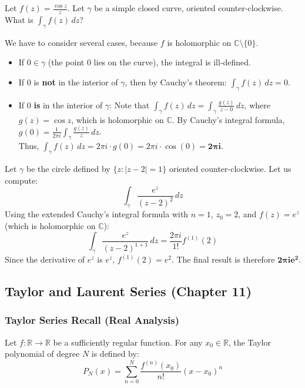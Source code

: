 \begin{example}[Example 1]
Let $f(z) = \frac{\cos z}{z}$. Let $\gamma$ be a simple closed curve, oriented counter-clockwise. What is $\int_{\gamma} f(z) \, dz$?

We have to consider several cases, because $f$ is holomorphic on $\mathbb{C} \setminus \{0\}$.
\begin{itemize}
    \item If $0 \in \gamma$ (the point $0$ lies on the curve), the integral is ill-defined.
    \item If $0$ is \textbf{not} in the interior of $\gamma$, then by Cauchy's theorem: $\int_{\gamma} f(z) \, dz = 0$.
    \item If $0$ \textbf{is} in the interior of $\gamma$:
    Note that $\int_{\gamma} f(z) \, dz = \int_{\gamma} \frac{g(z)}{z - 0} \, dz$, where $g(z) = \cos z$, which is holomorphic on $\mathbb{C}$. By Cauchy's integral formula, $g(0) = \frac{1}{2\pi i} \int_{\gamma} \frac{g(z)}{z} \, dz$. \\
    Thus, $\int_{\gamma} f(z) \, dz = 2\pi i \cdot g(0) = 2\pi i \cdot \cos(0) = \mathbf{2\pi i}$.
\end{itemize}
\end{example}

\begin{example}[Example 2]
Let $\gamma$ be the circle defined by $\{ z : |z - 2| = 1 \}$ oriented counter-clockwise. Let us compute:
$$\int_{\gamma} \frac{e^z}{(z - 2)^2} \, dz$$
Using the extended Cauchy's integral formula with $n=1$, $z_0=2$, and $f(z) = e^z$ (which is holomorphic on $\mathbb{C}$):
$$\int_{\gamma} \frac{e^z}{(z - 2)^{1+1}} \, dz = \frac{2\pi i}{1!} f^{(1)}(2)$$
Since the derivative of $e^z$ is $e^z$, $f^{(1)}(2) = e^2$. The final result is therefore $\mathbf{2\pi i e^2}$.
\end{example}

\subsection{Taylor and Laurent Series (Chapter 11)}

\subsubsection{Taylor Series Recall (Real Analysis)}

Let $f: \mathbb{R} \rightarrow \mathbb{R}$ be a sufficiently regular function. For any $x_0 \in \mathbb{R}$, the Taylor polynomial of degree $N$ is defined by:
$$P_N(x) = \sum_{n=0}^{N} \frac{f^{(n)}(x_0)}{n!} (x - x_0)^n$$

